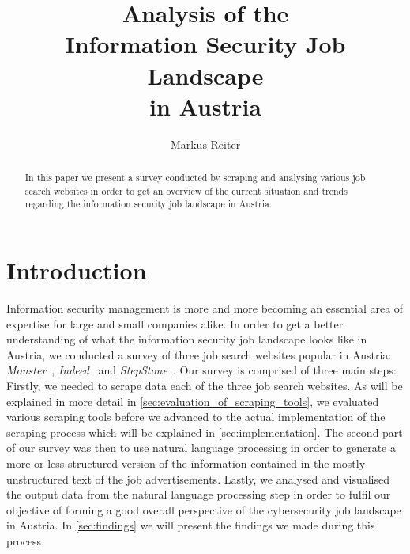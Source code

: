 \documentclass[runningheads]{llncs}
\begin{document}
\title{Analysis of the \texorpdfstring{\\}{} Information Security Job Landscape \texorpdfstring{\\}{} in Austria}

\author{Markus Reiter}


\maketitle

\vspace{8em}

\begin{abstract}

In this paper we present a survey conducted by scraping and analysing various job search websites in order to get an overview of the current situation and trends regarding the information security job landscape in Austria.


\end{abstract}

\newpage

\section{Introduction}
\label{sec:introduction}

Information security management is more and more becoming an essential area of expertise for large and small companies alike. In order to get a better understanding of what the information security job landscape looks like in Austria, we conducted a survey of three job search websites popular in Austria: \textit{Monster}~\cite{monster}, \textit{Indeed}~\cite{indeed} and \textit{StepStone}~\cite{stepstone}. Our survey is comprised of three main steps: Firstly, we needed to scrape data each of the three job search websites. As will be explained in more detail in \autoref{sec:evaluation_of_scraping_tools}, we evaluated various scraping tools before we advanced to the actual implementation of the scraping process which will be explained in \autoref{sec:implementation}. The second part of our survey was then to use natural language processing in order to generate a more or less structured version of the information contained in the mostly unstructured text of the job advertisements. Lastly, we analysed and visualised the output data from the natural language processing step in order to fulfil our objective of forming a good overall perspective of the cybersecurity job landscape in Austria. In \autoref{sec:findings} we will present the findings we made during this process.
\end{document}
